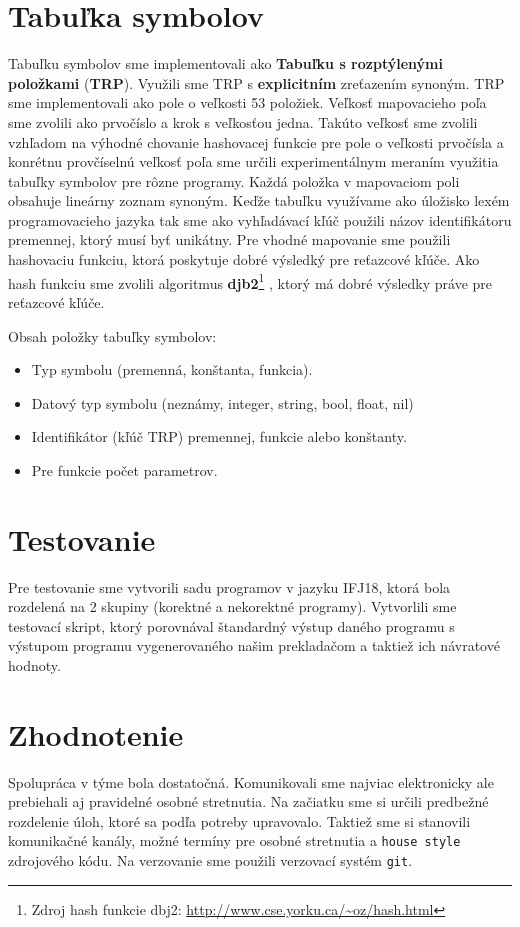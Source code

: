 \documentclass[a4paper, 11pt]{article}
\begin{document}
\section{Tabuľka symbolov}
Tabuľku symbolov sme implementovali ako \textbf{Tabuľku s rozptýlenými položkami} (\textbf{TRP}). Využili sme TRP s \textbf{explicitním} zreťazením synoným. TRP sme implementovali ako pole o veľkosti 53 položiek. Veľkosť mapovacieho poľa sme zvolili ako prvočíslo a krok s veľkosťou jedna. Takúto veľkosť sme zvolili vzhľadom na výhodné chovanie hashovacej funkcie pre pole o veľkosti prvočísla a konrétnu provčíselnú veľkosť poľa sme určili experimentálnym meraním využitia tabuľky symbolov pre rôzne programy. Každá položka v mapovaciom poli obsahuje lineárny zoznam synoným. Keďže tabuľku využívame ako úložisko lexém programovacieho jazyka tak sme ako vyhľadávací kľúč použili názov identifikátoru premennej, ktorý musí byť unikátny. Pre vhodné mapovanie sme použili hashovaciu funkciu, ktorá poskytuje dobré výsledký pre reťazcové kľúče. Ako hash funkciu sme zvolili algoritmus \textbf{djb2}\footnote{Zdroj hash funkcie dbj2: 
	\url{http://www.cse.yorku.ca/~oz/hash.html}}
, ktorý má dobré výsledky práve pre reťazcové kľúče.

Obsah položky tabuľky symbolov:
\begin{itemize}
	\item Typ symbolu (premenná, konštanta, funkcia).
	\item Datový typ symbolu (neznámy, integer, string, bool, float, nil)
	\item Identifikátor (kľúč TRP) premennej, funkcie alebo konštanty.
	\item Pre funkcie počet parametrov.
\end{itemize}
\section{Testovanie}
Pre testovanie sme vytvorili sadu programov v jazyku IFJ18, ktorá bola rozdelená na 2 skupiny (korektné a nekorektné programy). Vytvorlili sme testovací skript, ktorý porovnával štandardný výstup daného programu s výstupom programu vygenerovaného našim prekladačom a taktiež ich návratové hodnoty. 
\section{Zhodnotenie}
Spolupráca v týme bola dostatočná. Komunikovali sme najviac elektronicky ale prebiehali aj pravidelné osobné stretnutia. Na začiatku sme si určili predbežné rozdelenie úloh, ktoré sa podľa potreby upravovalo. Taktiež sme si stanovili komunikačné kanály, možné termíny pre osobné stretnutia a \texttt{house style} zdrojového kódu. Na verzovanie sme použili verzovací systém \texttt{git}.
\end{document}

